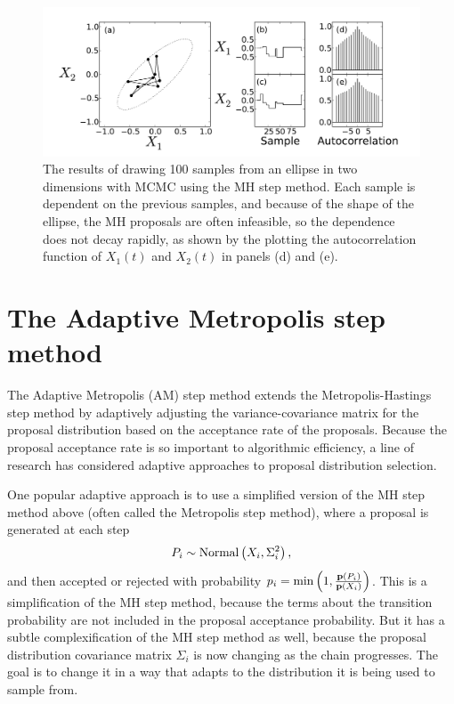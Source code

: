 \begin{figure}[ht]
\begin{center}
\includegraphics[width=\textwidth]{metropolis-ball.pdf}
\caption{The results of drawing 100 samples from an ellipse in two
  dimensions with MCMC using the MH step method.  Each sample is
  dependent on the previous samples, and because of the shape of the
  ellipse, the MH proposals are often infeasible, so the dependence
  does not decay rapidly, as shown by the plotting the autocorrelation
  function of $X_1(t)$ and $X_2(t)$ in panels (d) and (e).}
\label{metropolis-ball}
\end{center}
\end{figure}


\section{The Adaptive Metropolis step method}
The Adaptive Metropolis (AM) step method extends the
Metropolis-Hastings step method by adaptively adjusting the
variance-covariance matrix for the proposal distribution based on the
acceptance rate of the
proposals.\cite{haarrio_adaptive_2001,patil_pymc:_2010} Because the
proposal acceptance rate is so important to algorithmic efficiency, a
line of research has considered adaptive approaches to proposal
distribution
selection.\cite{gelman_efficient_1996,gilks_adaptive_1994,
  gilks_adaptive_1998,sahu_self_1999}

One popular adaptive approach is to use a simplified version of the MH
step method above (often called the Metropolis step method), where a
proposal is generated at each step
\[
P_i \sim \operatorname{Normal}\left(X_i, \Sigma^2_i\right),
\]
and then accepted or rejected with probability $p_i = \min\left(1,
\frac{\mathbf{p}(P_i)}{\mathbf{p}(X_i)}\right)$.  This is a simplification of
the MH step method, because the terms about the transition probability
are not included in the proposal acceptance probability.  But it has a
subtle complexification of the MH step method as well, because the
proposal distribution covariance matrix $\Sigma_i$ is now changing
as the chain progresses.  The goal is to change it in a way that
adapts to the distribution it is being used to sample from.

